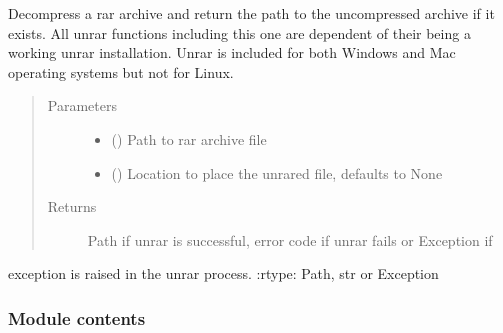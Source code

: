 \documentclass[letterpaper,10pt,english]{sphinxmanual}
\begin{document}
\begin{fulllineitems}
\label{\detokenize{polo.utils:polo.utils.unrar_utils.unrar_archive}}
De\sphinxhyphen{}compress a rar archive and return the path to the
uncompressed archive if it exists. All unrar functions
including this one are dependent of their being a working 
unrar installation. Unrar is included for both Windows and Mac
operating systems but not for Linux.
\begin{quote}\begin{description}
\item[{Parameters}] \leavevmode\begin{itemize}
\item {} 
 () \textendash{} Path to rar archive file

\item {} 
 (\sphinxstyleliteralemphasis{\sphinxupquote{, }}) \textendash{} Location to place the unrared file, defaults to None

\end{itemize}

\item[{Returns}] \leavevmode
Path if unrar is successful, error code if unrar fails or Exception if

\end{description}\end{quote}

exception is raised in the unrar process.
:rtype: Path, str or Exception

\end{fulllineitems}



\subsubsection{Module contents}
\label{\detokenize{polo.utils:module-polo.utils}}\label{\detokenize{polo.utils:module-contents}}
\end{document}
